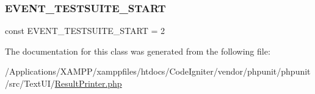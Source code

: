 \subsubsection{\texorpdfstring{E\+V\+E\+N\+T\+\_\+\+T\+E\+S\+T\+S\+U\+I\+T\+E\+\_\+\+S\+T\+A\+RT}{EVENT\_TESTSUITE\_START}}
{\footnotesize\ttfamily const E\+V\+E\+N\+T\+\_\+\+T\+E\+S\+T\+S\+U\+I\+T\+E\+\_\+\+S\+T\+A\+RT = 2}



The documentation for this class was generated from the following file\+:\begin{DoxyCompactItemize}
\item 
/\+Applications/\+X\+A\+M\+P\+P/xamppfiles/htdocs/\+Code\+Igniter/vendor/phpunit/phpunit/src/\+Text\+U\+I/\mbox{\hyperlink{_text_u_i_2_result_printer_8php}{Result\+Printer.\+php}}\end{DoxyCompactItemize}
